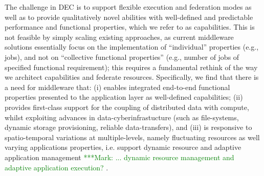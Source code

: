 \documentclass[11pt,final]{article}
\newcommand{\msnote}[1]{ {\textcolor{green} { ***Mark: #1 }}}
\newcommand{\msnote}[1]{}
\begin{document}
{
The challenge in DEC is to support flexible execution and federation
modes as well as to provide qualitatively novel abilities with
well-defined and predictable performance and functional properties,
which we refer to as capabilities.  This is not feasible by simply
scaling existing approaches, as current middleware solutions
essentially focus on the implementation of ``individual'' properties
(e.g., jobs), and not on ``collective functional properties'' (e.g.,
number of jobs of specified functional requirement); this requires a
fundamental rethink of the way we architect capabilities and federate
resources.  Specifically, we find that there is a need for middleware
that: (i) enables integrated end-to-end functional properties
presented to the application layer as well-defined capabilities; (ii)
provides first-class support for the coupling of distributed data with
compute, whilst exploiting advances in data-cyberinfrastucture (such
as file-systems, dynamic storage provisioning, reliable
data-transfers), and (iii) is responsive to spatio-temporal variations
at multiple-levels, namely fluctuating resources as well varying
applications properties, i.e. support dynamic resource and adaptive
application management\msnote{... dynamic resource management and adaptive
application execution?}.



}
\end{document}
